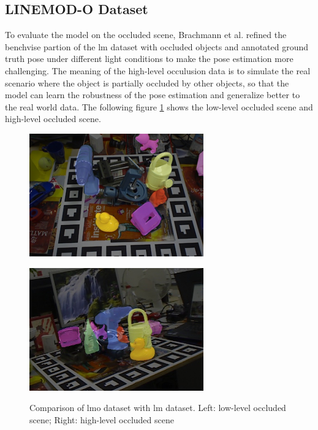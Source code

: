 \documentclass[12pt,DIV14,BCOR12mm,a4paper,footinclude=false,headinclude,parskip=half-,twoside,openright,cleardoublepage=empty,toc=index,bibliography=totoc,listof=totoc]{scrreprt}
\numberwithin{equation}{chapter}
\begin{document}
\subsection{LINEMOD-O Dataset}
To evaluate the model on the occluded scene, Brachmann et al. \cite{dataV4MUMX2020} refined the benchvise partion of the \gls{lm} dataset with occluded objects and annotated ground truth pose under different light conditions to make the pose estimation more challenging. The meaning of the high-level occulusion data is to simulate the real scenario where the object is partially occluded by other objects, so that the model can learn the robustness of the pose estimation and generalize better to the real world data. The following figure \ref{img:linemod_o} shows the low-level occluded scene and high-level occluded scene.
\begin{figure}[h]
  \centering
  \begin{minipage}{.5\textwidth}
    \centering
    \includegraphics[scale=.6]{img/nooclu.png}
    \label{img:nooclu}
  \end{minipage}%
  \begin{minipage}{.5\textwidth}
    \centering
    \includegraphics[scale=.6]{img/oclu.png}
    \label{img:oclu}
  \end{minipage}
  \caption{Comparison of \gls{lmo} dataset with \gls{lm} dataset. Left: low-level occluded scene; Right: high-level occluded scene}
  \label{img:linemod_o}
\end{figure}
\end{document}
